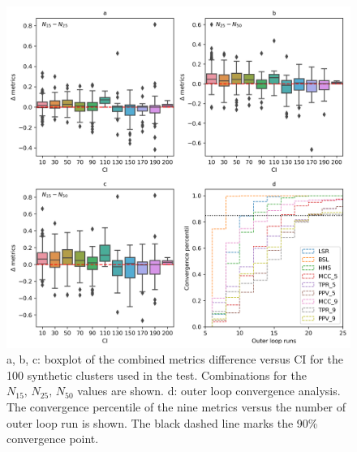 \documentclass[draft]{aa}
\begin{document}
 \begin{figure}
 \includegraphics[width=\hsize]{figs/upmask_N.png}
 \caption{a, b, c: boxplot of the combined metrics difference versus CI for the
 100 synthetic clusters used in the test. Combinations for the
 $N_{15},\,N_{25},\,N_{50}$ values are shown.
 d: outer loop convergence analysis. The convergence percentile
 of the nine metrics versus the number of outer loop run is shown. The black
 dashed line marks the 90\% convergence point.}
 \label{fig:UPMASKruns}
 \end{figure}
\end{document}
